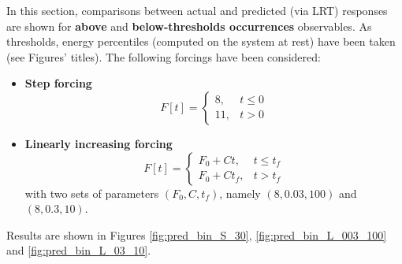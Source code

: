 \documentclass{article}
\begin{document}
In this section, comparisons between actual and predicted (via LRT) responses are shown for \textbf{above} and \textbf{below-thresholds occurrences} observables.
As thresholds, energy percentiles (computed on the system at rest) have been taken (see Figures' titles).
The following forcings have been considered:

\begin{itemize}
	\item \textbf{Step forcing}
		\begin{equation}
		F[t]=\left\{\begin{array}{ll}{8,} & {t \leq 0} \\ {11,} & {t > 0}\end{array}\right.
		\end{equation}		
	\item \textbf{Linearly increasing forcing}
		\begin{equation}
		F[t]=\left\{\begin{array}{ll}{F_0 + C t,} & {t \leq t_f} \\ {F_0 + C t_f,} & {t > t_f}\end{array}\right.
		\end{equation}
		with two sets of parameters $(F_0, C, t_f)$, namely $(8, 0.03, 100)$ and $(8, 0.3, 10)$.
\end{itemize}
Results are shown in Figures \ref{fig:pred_bin_S_30}, \ref{fig:pred_bin_L_003_100} and \ref{fig:pred_bin_L_03_10}.
\end{document}
